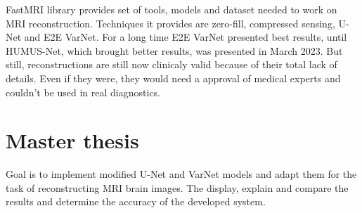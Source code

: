 \documentclass[10pt,a4paper]{article}
\begin{document}
FastMRI library provides set of tools, models and dataset needed to work on MRI reconstruction. Techniques it provides are zero-fill, compressed sensing, U-Net and E2E VarNet. For a long time E2E VarNet presented best results, until HUMUS-Net, which brought better results, was presented in March 2023. But still, reconstructions are still now clinicaly valid because of their total lack of details. Even if they were, they would need a approval of medical experts and couldn't be used in real diagnostics.

\section{Master thesis}

Goal is to implement modified U-Net and VarNet models and adapt them for the task of reconstructing MRI brain images. The display, explain and compare the results and determine the accuracy of the developed system.
\end{document}
